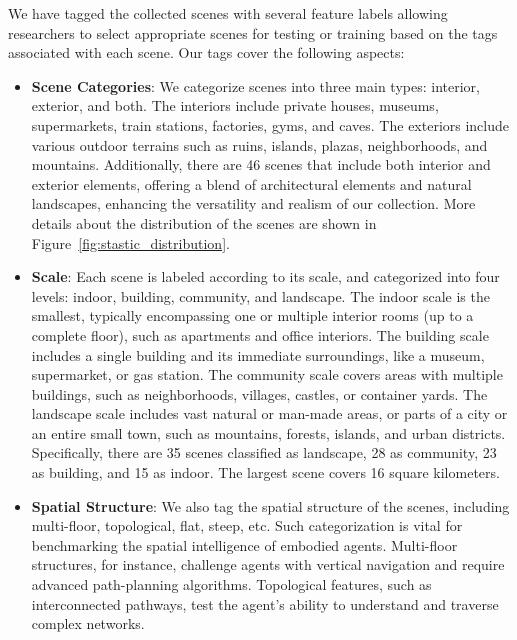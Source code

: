\documentclass{article}
\begin{document}
We have tagged the collected scenes with several feature labels allowing researchers to select appropriate scenes for testing or training based on the tags associated with each scene. Our tags cover the following aspects:
\begin{itemize}
    \item \textbf{Scene Categories}: We categorize scenes into three main types: interior, exterior, and both. The interiors include private houses, museums, supermarkets, train stations, factories, gyms, and caves. The exteriors include various outdoor terrains such as ruins, islands, plazas, neighborhoods, and mountains. Additionally, there are 46 scenes that include both interior and exterior elements, offering a blend of architectural elements and natural landscapes, enhancing the versatility and realism of our collection. More details about the distribution of the scenes are shown in Figure~\ref{fig:stastic_distribution}.
    \item \textbf{Scale}: Each scene is labeled according to its scale, and categorized into four levels: indoor, building, community, and landscape. The indoor scale is the smallest, typically encompassing one or multiple interior rooms (up to a complete floor), such as apartments and office interiors. The building scale includes a single building and its immediate surroundings, like a museum, supermarket, or gas station. The community scale covers areas with multiple buildings, such as neighborhoods, villages, castles, or container yards. The landscape scale includes vast natural or man-made areas, or parts of a city or an entire small town, such as mountains, forests, islands, and urban districts.
    Specifically, there are 35 scenes classified as landscape, 28 as community, 23 as building, and 15 as indoor. The largest scene covers 16 square kilometers.
    \item \textbf{Spatial Structure}: 
    We also tag the spatial structure of the scenes, including multi-floor, topological, flat, steep, etc. Such categorization is vital for benchmarking the spatial intelligence of embodied agents. Multi-floor structures, for instance, challenge agents with vertical navigation and require advanced path-planning algorithms. Topological features, such as interconnected pathways, test the agent's ability to understand and traverse complex networks.

\end{itemize}
\end{document}
